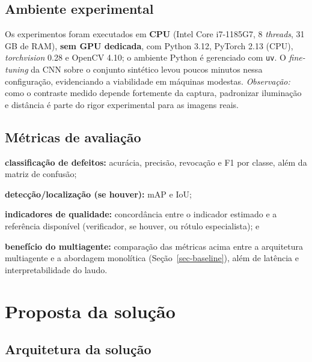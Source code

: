 \documentclass[
	article,			%
	11pt,				%
	oneside,			%
	a4paper,			%
	english,			%
	brazilian,			%
	sumario=tradicional
	]{abntex2}
\begin{document}
\subsection{Ambiente experimental}

Os experimentos foram executados em \textbf{CPU} (Intel Core i7-1185G7, 8
\textit{threads}, 31\,GB de RAM), \textbf{sem GPU dedicada}, com Python 3.12, PyTorch
2.13 (CPU), \textit{torchvision} 0.28 e OpenCV 4.10; o ambiente Python é gerenciado com
\texttt{uv}. O \textit{fine-tuning} da CNN sobre o conjunto sintético levou poucos
minutos nessa configuração, evidenciando a viabilidade em máquinas modestas.
\textit{Observação:} como o contraste medido depende fortemente da captura, padronizar
iluminação e distância é parte do rigor experimental para as imagens reais.

\subsection{Métricas de avaliação}

\begin{alineas}
	\item \textbf{classificação de defeitos:} acurácia, precisão, revocação e F1
	por classe, além da matriz de confusão;
	\item \textbf{detecção/localização (se houver):} mAP e IoU;
	\item \textbf{indicadores de qualidade:} concordância entre o indicador
	estimado e a referência disponível (verificador, se houver, ou rótulo
	especialista); e
	\item \textbf{benefício do multiagente:} comparação das métricas acima entre a
	arquitetura multiagente e a abordagem monolítica (Seção~\ref{sec-baseline}),
	além de latência e interpretabilidade do laudo.
\end{alineas}

\section{Proposta da solução}\label{sec-proposta}

\subsection{Arquitetura da solução}
\end{document}
